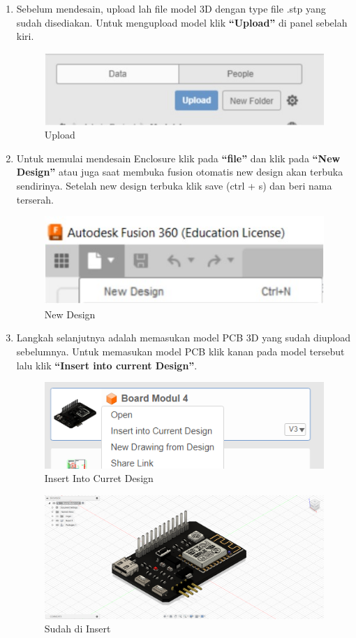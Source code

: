 \begin{enumerate}
    \item Sebelum mendesain, upload lah file model 3D dengan type file .stp yang sudah disediakan. Untuk
    mengupload model klik \textbf{“Upload”} di panel sebelah kiri.
        \begin{figure}[H]
            \centering
            \includegraphics[width=0.5\linewidth]{P3/img/image3.jpg}
            \caption{Upload}
            \label{fig:Upload}
        \end{figure}

    \item Untuk memulai mendesain Enclosure klik pada \textbf{“file”} dan klik pada \textbf{“New Design”} atau juga saat
    membuka fusion otomatis new design akan terbuka sendirinya. Setelah new design terbuka klik
    save (ctrl + s) dan beri nama terserah.
        \begin{figure}[H]
            \centering
            \includegraphics[width=0.5\linewidth]{P3/img/image4.jpg}
            \caption{New Design}
            \label{fig:New Design}
        \end{figure}

    \item Langkah selanjutnya adalah memasukan model PCB 3D yang sudah diupload sebelumnya. Untuk
    memasukan model PCB klik kanan pada model tersebut lalu klik \textbf{“Insert into current Design”}.
        \begin{figure}[H]
            \centering
            \includegraphics[width=0.5\linewidth]{P3/img/Insert to Current Design.png}
            \caption{Insert Into Curret Design}
            \label{fig:Insert Into Curret Design}
        \end{figure}

        \begin{figure}[H]
            \centering
            \includegraphics[width=0.5\linewidth]{P3/img/Sudah di Insert.png}
            \caption{Sudah di Insert}
            \label{fig:Sudah di Insert}
        \end{figure}


\end{enumerate}

